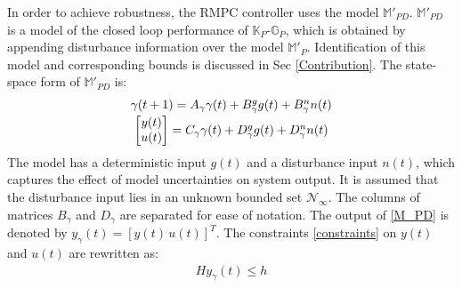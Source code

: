 \documentclass[letterpaper, 10 pt, conference]{ieeeconf}  %
\begin{document}
	In order to achieve robustness, the RMPC controller uses the model $\mathbb{M}'_{PD}$. $\mathbb{M}'_{PD}$ is a model of the closed loop performance of $\mathbb{K}_P$-$\mathbb{G}_P$, which is obtained by appending disturbance information over the model $\mathbb{M}'_{P}$. Identification of this model and corresponding bounds is discussed in Sec \ref{Contribution}. The state-space form of $\mathbb{M}'_{PD}$ is:
	\begin{equation}
	\begin{matrix}
	\gamma(t+1) = A_\gamma\gamma(t) + B^g_\gamma g(t) + B^n_\gamma n(t) \vspace{2pt}\\
	\begin{bmatrix}y(t)\\u(t)\end{bmatrix} = C_\gamma\gamma(t) + D^g_\gamma g(t) + D^n_\gamma n(t)
	\end{matrix}
	\label{M_PD}
	\end{equation}
	The model has a deterministic input $g(t)$ and a disturbance input $n(t)$, which captures the effect of model uncertainties on system output. It is assumed that the disturbance input lies in an unknown bounded set $\mathcal{N}_{\infty}$.
	The columns of matrices $B_\gamma$ and $D_\gamma$ are separated for ease of notation. The output of \eqref{M_PD} is denoted by $y_{\gamma}(t)=[y(t) \hspace{2pt} u(t)]^T$. The constraints \eqref{constraints} on $y(t)$ and $u(t)$  are rewritten as: 
	\begin{equation*}
	\begin{matrix}
	Hy_{\gamma}(t) \leq h
	\end{matrix}
	\end{equation*}
\end{document}
